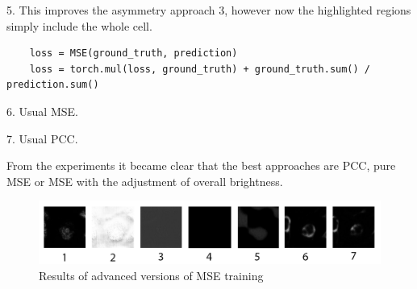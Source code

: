 5. This improves the asymmetry approach 3, however now the highlighted regions simply include the whole cell.
\begin{lstlisting}
	loss = MSE(ground_truth, prediction)
	loss = torch.mul(loss, ground_truth) + ground_truth.sum() / prediction.sum()
\end{lstlisting}

6. Usual MSE.

7. Usual PCC.

From the experiments it became clear that the best approaches are PCC, pure MSE or MSE with the adjustment of overall brightness.

\begin{figure}[H]
	\begin{center}
		\includegraphics[width=\linewidth]{bilder/golgi/asymmetrical-predictions.png}
		\caption{Results of advanced versions of MSE training}\label{fig:golgi-asymmetrical-predictions}
	\end{center}
\end{figure} 